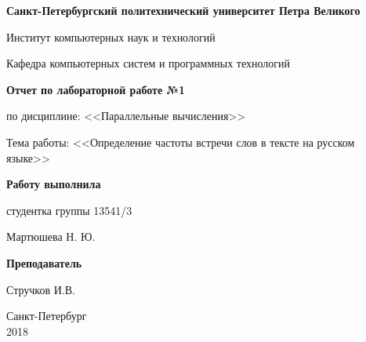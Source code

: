 \begin{titlepage}
\begin{center}

\textbf{Санкт-Петербургский политехнический университет Петра Великого}

\vspace{5mm}
Институт компьютерных наук и технологий

\vspace{5mm}
Кафедра компьютерных систем и программных технологий

\vspace*{\fill}

\Large{\textbf{Отчет по лабораторной работе №1}}

\large{по дисциплине: <<Параллельные вычисления>>}

\vspace*{2mm}
\large{Тема работы: <<Определение частоты встречи слов в тексте на русском языке>>}

\vspace*{\fill}
\end{center}

\begin{large}
\hspace{0.4\linewidth} \textbf{Работу выполнила}

\vspace{5mm}
\hspace{0.4\linewidth} студентка группы 13541/3

\vspace{3mm}
\hspace{0.4\linewidth} \underline{\hspace{2cm} } \hspace{3mm} Мартюшева Н. Ю.

\vspace{3mm}
\hspace{0.4\linewidth} \textbf{Преподаватель}

\vspace{5mm}
\hspace{0.4\linewidth} \underline{\hspace{2cm} } \hspace{3mm} Стручков И.В.
\end{large}

\vspace*{3cm}

\begin{center}
\normalsize Санкт-Петербург\\2018
\end{center}
\end{titlepage}